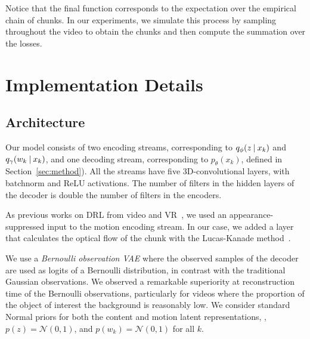 Notice that the final function corresponds to the expectation over the empirical chain of chunks.
In our experiments, we simulate this process by sampling throughout the video to obtain the chunks and then compute the summation over the losses.


\section{Implementation Details}
\label{sec:implementation}

\subsection{Architecture}

Our model consists of two encoding streams, corresponding to $q_\phi(z \:\lvert\: x_{k})$ and  $q_\gamma(w_k \:\lvert\: x_{k})$, and one decoding stream, corresponding to $p_\theta(x_{k})$, defined in Section~\ref{sec:method}).
All the streams have five 3D-convolutional layers, with batchnorm and ReLU activations. 
The number of filters in the hidden layers of the decoder is double the number of filters in the encoders.

As previous works on DRL from video and VR~\cite{Siarohin2019,Siarohin2019nips,Aberman2019}, we used an appearance-suppressed input to the motion encoding stream. 
In our case, we added a layer that calculates the optical flow of the chunk with the Lucas-Kanade method~\cite{Lucas1981}.

We use a \textit{Bernoulli observation VAE} where the observed samples of the decoder are used as logits of a Bernoulli distribution, in contrast with the traditional Gaussian observations. 
We observed a remarkable superiority at reconstruction time of the Bernoulli observations, particularly for videos where the proportion of the object of interest \wrt the background is reasonably low.
We consider standard Normal priors for both the content and motion latent representations, \ie, $p(z) = \mathcal{N}(0,1)$, and  $p(w_k) = \mathcal{N}(0,1)$ for all $k$.

